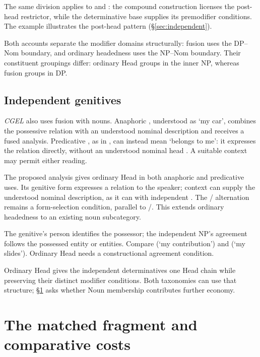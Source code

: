 \documentclass[12pt]{article}
\begin{document}
The same division applies to  and : the compound construction licenses the post-head restrictor, while the determinative base supplies its premodifier conditions. The example  illustrates the post-head pattern (§\ref{sec:independent}).

Both accounts separate the modifier domains structurally: fusion uses the DP--Nom boundary, and ordinary headedness uses the NP--Nom boundary. Their constituent groupings differ: ordinary Head groups  in the inner NP, whereas fusion groups  in DP.

\subsection{Independent genitives}\label{sec:genitive-head}

\textit{CGEL} also uses fusion with nouns. Anaphoric , understood as \enquote*{my car}, combines the possessive relation with an understood nominal description and receives a fused analysis. Predicative , as in , can instead mean \enquote*{belongs to me}: it expresses the relation directly, without an understood nominal head \citep[410--411, 469--471]{huddleston2002}. A suitable context may permit either reading.

The proposed analysis gives  ordinary Head in both anaphoric and predicative uses. Its genitive form expresses a relation to the speaker; context can supply the understood nominal description, as it can with independent . The / alternation remains a form-selection condition, parallel to /. This extends ordinary headedness to an existing noun subcategory.

The genitive's person identifies the possessor; the independent NP's agreement follows the possessed entity or entities. Compare  (\enquote*{my contribution}) and  (\enquote*{my slides}). Ordinary Head needs a constructional agreement condition.

Ordinary Head gives the independent determinatives one Head chain while preserving their distinct modifier conditions. Both taxonomies can use that structure; §\ref{sec:economy} asks whether Noun membership contributes further economy.

\section{The matched fragment and comparative costs}\label{sec:economy}
\end{document}
